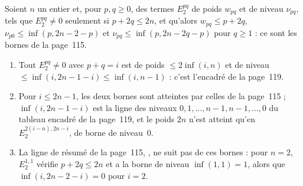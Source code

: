 \begin{encadre}
\begin{enonce}
Soient $n$ un entier et, pour $p, q \geq 0$, des termes $E_2^{pq}$ de poids $w_{pq}$ et de niveau $\nu_{pq}$, tels que $E_2^{pq} \neq 0$ seulement si $p + 2q \leq 2n$, et qu'alors $w_{pq} \leq p + 2q$, $\nu_{p0} \leq \inf(p, 2n - 2 - p)$ et $\nu_{pq} \leq \inf(p, 2n - 2q - p)$ pour $q \geq 1$ : ce sont les bornes de la page~115.
\begin{enumerate}
\item Tout $E_2^{pq} \neq 0$ avec $p + q = i$ est de poids $\leq 2\inf(i, n)$ et de niveau $\leq \inf(i, 2n - 1 - i) \leq \inf(i, n - 1)$ : c'est l'encadré de la page~119.
\item Pour $i \leq 2n - 1$, les deux bornes sont atteintes par celles de la page~115 ; $\inf(i, 2n - 1 - i)$ est la ligne des niveaux $0, 1, \ldots, n - 1, n - 1, \ldots, 0$ du tableau encadré de la page~119, et le poids $2n$ n'est atteint qu'en $E_2^{2(i-n), 2n-i}$, de borne de niveau~$0$.
\item La ligne de résumé de la page~115, , ne suit pas de ces bornes : pour $n = 2$, $E_2^{1,1}$ vérifie $p + 2q \leq 2n$ et a la borne de niveau $\inf(1, 1) = 1$, alors que $\inf(i, 2n - 2 - i) = 0$ pour $i = 2$.
\end{enumerate}
\end{enonce}
\end{encadre}

